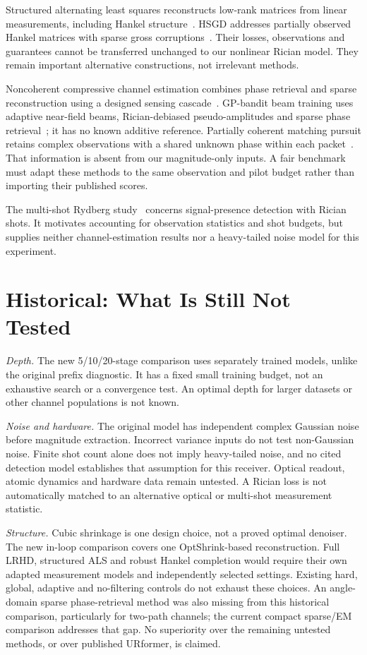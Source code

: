 \documentclass[journal]{IEEEtran}
\begin{document}
Structured alternating least squares reconstructs low-rank matrices from
linear measurements, including Hankel structure~\cite{zachariah2012}.
HSGD addresses partially observed Hankel matrices with sparse gross
corruptions~\cite{cai2023}. Their losses, observations and guarantees
cannot be transferred unchanged to our nonlinear Rician model. They
remain important alternative constructions, not irrelevant methods.

Noncoherent compressive channel estimation combines phase retrieval and
sparse reconstruction using a designed sensing cascade~\cite{rasekh2018}.
GP-bandit beam training uses adaptive near-field beams, Rician-debiased
pseudo-amplitudes and sparse phase retrieval~\cite{wang2026}; it has no
known additive reference. Partially coherent matching pursuit retains
complex observations with a shared unknown phase within each
packet~\cite{yi2024}. That information is absent from our magnitude-only
inputs. A fair benchmark must adapt these methods to the same observation
and pilot budget rather than importing their published scores.

The multi-shot Rydberg study~\cite{atapattu2026} concerns signal-presence
detection with Rician shots. It motivates accounting for observation
statistics and shot budgets, but supplies neither channel-estimation
results nor a heavy-tailed noise model for this experiment.

\section{Historical: What Is Still Not Tested}
\textit{Depth.} The new 5/10/20-stage comparison uses separately trained
models, unlike the original prefix diagnostic. It has a fixed small
training budget, not an exhaustive search or a convergence test. An
optimal depth for larger datasets or other channel populations is not known.

\textit{Noise and hardware.} The original model has independent complex
Gaussian noise before magnitude extraction. Incorrect variance inputs
do not test non-Gaussian noise. Finite shot count alone does not imply
heavy-tailed noise, and no cited detection model establishes that
assumption for this receiver. Optical readout, atomic dynamics and
hardware data remain untested. A Rician loss is not automatically matched
to an alternative optical or multi-shot measurement statistic.

\textit{Structure.} Cubic shrinkage is one design choice, not a proved
optimal denoiser. The new in-loop comparison covers one OptShrink-based
reconstruction. Full LRHD, structured ALS and robust Hankel completion
would require their own adapted measurement models and independently
selected settings. Existing hard,
global, adaptive and no-filtering controls do not exhaust these choices.
An angle-domain sparse phase-retrieval method was also missing from this
historical comparison, particularly for two-path channels; the current
compact sparse/EM comparison addresses that gap. No superiority over the
remaining untested methods, or over published URformer, is claimed.
\end{document}
